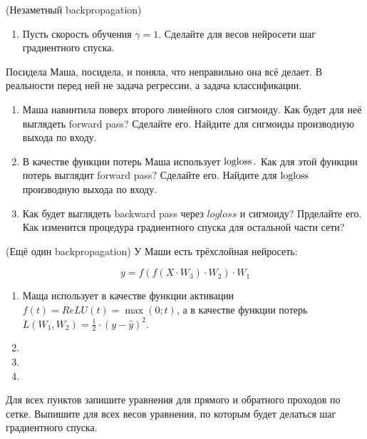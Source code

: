\begin{problem}{(Незаметный backpropagation)}
\begin{enumerate}
		\item Пусть скорость обучения $\gamma = 1$.  Сделайте для весов нейросети шаг градиентного спуска. 
	\end{enumerate}

	Посидела Маша, посидела, и поняла, что неправильно она всё делает. В реальности перед ней не задача регрессии, а задача классификации. 
	
	\begin{enumerate}	
		\item Маша навинтила поверх второго линейного слоя сигмоиду. Как будет для неё выглядеть forward pass? Сделайте его. Найдите для сигмоиды производную выхода по входу.
		
		\item В качестве функции потерь Маша использует $\operatorname{logloss}.$ Как для этой функции потерь выглядит forward pass? Сделайте его. Найдите для $\operatorname{logloss}$ производную выхода по входу. 
		
		\item Как будет выглядеть backward pass через $logloss$ и сигмоиду? Прделайте его. Как изменится процедура градиентного спуска для остальной части сети? 
	\end{enumerate}
\end{problem} 


\begin{problem}{(Ещё один backpropagation)}
    У Маши есть трёхслойная нейросеть: 
    
	$$ 
	y = f(f(X \cdot W_3 ) \cdot W_2) \cdot W_1 
	$$
	
	\begin{enumerate} 
	    \item Маща использует в качестве функции активации $f(t) = ReLU(t) =  \max(0; t)$, а в качестве функции потерь $L(W_1, W_2) = \frac{1}{2} \cdot (y - \hat y)^2$.
	    
	    \item 
	    
	    
	    \item 
	    
	    \item 
	
	\end{enumerate}
	
	Для всех пунктов запишите уравнения для прямого и обратного проходов по сетке. Выпишите для всех весов уравнения, по которым будет делаться шаг градиентного спуска. 
\end{problem} 


